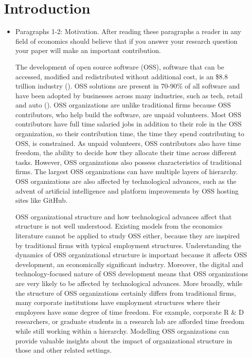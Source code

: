 \documentclass[12pt,notitlepage]{article}
\begin{document}
\section{Introduction}
\begin{itemize}
\item Paragraphs 1-2: Motivation. After reading these paragraphs a reader in any field of economics should believe that if you answer your research question your paper will make an important contribution.

The development of open source software (OSS), software that can be accessed, modified and redistributed without additional cost, is an \$8.8 trillion industry (\cite{hoffmann_value_2024}). OSS solutions are present in 70-90\% of all software and have been adopted by businesses across many industries, such as tech, retail and auto (\cite{nagle_open_2017}). OSS organizations are unlike traditional firms because OSS contributors, who help build the software, are unpaid volunteers. Most OSS contributors have full time salaried jobs in addition to their role in the OSS organization, so their contribution time, the time they spend contributing to OSS, is constrained. As unpaid volunteers, OSS contributors also have time freedom, the ability to decide how they allocate their time across different tasks. However, OSS organizations also possess characteristics of traditional firms. The largest OSS organizations can have multiple layers of hierarchy. OSS organizations are also affected by technological advances, such as the advent of artificial intelligence and platform improvements by OSS hosting sites like GitHub.

OSS organizational structure and how technological advances affect that structure is not well understood. Existing models from the economics literature cannot be applied to study OSS either, because they are inspired by traditional firms with typical employment structures. Understanding the dynamics of OSS organizational structure is important because it affects OSS development, an economically significant industry. Moreover, the digital and technology-focused nature of OSS development means that OSS organizations are very likely to be affected by technological advances. More broadly, while the structure of OSS organizations certainly differs from traditional firms, many corporate institutions have employment structures where their employees have some degree of time freedom. For example, corporate R \& D researchers, or graduate students in a research lab are afforded time freedom while still working within a hierarchy. Modelling OSS organizations can provide valuable insights about the impact of organizational structure in those and other related settings. 


\end{itemize}
\end{document}
